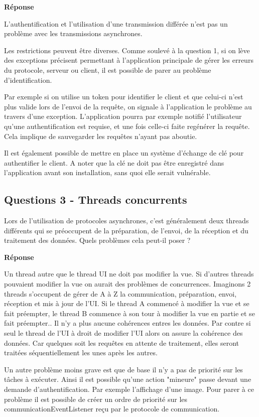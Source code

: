 \documentclass[francais,12pt]{article}
\begin{document}
	
	{\color[rgb]{0,0.5,0.23}\textbf{Réponse}}
	
	L'authentification et l'utilisation d'une transmission différée n'est pas un problème avec les transmissions asynchrones. 
	
	Les restrictions peuvent être diverses. Comme soulevé à la question 1, si on lève des exceptions précisent permettant à l'application principale de gérer les erreurs du protocole, serveur ou client, il est possible de parer au problème d'identification. 
	
	Par exemple si on utilise un token pour identifier le client et que celui-ci n'est plus valide lors de l'envoi de la requête, on signale à l'application le problème au travers d'une exception. L'application pourra par exemple notifié l'utilisateur qu'une authentification est requise, et une fois celle-ci faite regénérer la requête. Cela implique de sauvegarder les requêtes n'ayant pas aboutie. 
	
	Il est également possible de mettre en place un système d'échange de clé pour authentifier le client. A noter que la clé ne doit pas être enregistré dans l'application avant son installation, sans quoi elle serait vulnérable.
	
	\subsection*{Questions 3 - Threads concurrents}
	Lors de l'utilisation de protocoles asynchrones, c'est généralement deux threads différents qui se préoccupent de la préparation, de l'envoi, de la réception et du traitement des données. Quels problèmes cela peut-il poser ?
	
	{\color[rgb]{0,0.5,0.23}\textbf{Réponse}}
	
	
	Un thread autre que le thread UI ne doit pas modifier la vue. Si d'autres threads pouvaient modifier la vue on aurait des problèmes de concurrences. Imaginons 2 threads s'occupent de gérer de A à Z la communication, préparation, envoi, réception et mis à jour de l’UI. Si le thread A commencé à modifier la vue et se fait préempter, le thread B commence à son tour  à modifier la vue en partie et se fait préempter.. Il n'y a plus aucune cohérences entres les données. Par contre si seul le thread de l'UI à droit de modifier l’UI alors on assure la cohérence des données. Car quelques soit les requêtes en attente de traitement, elles seront traitées séquentiellement les unes après les autres.
	
	Un autre problème moins grave est que de base il n'y a pas de priorité sur les tâches à exécuter. Ainsi il est possible qu'une action "mineure" passe devant une demande d'authentification. Par exemple l'affichage d'une image. Pour parer à ce problème il est possible de créer un ordre de priorité sur les communicationEventListener reçu par le protocole de communication. 
\end{document}
